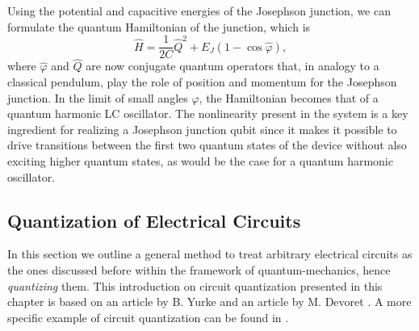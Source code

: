 \smallskip

Using the potential and capacitive energies of the Josephson junction, we can formulate the quantum Hamiltonian of the junction, which is
%
\begin{equation}
\hat{H} = \frac{1}{2C}\hat{Q}^2+E_J(1-\cos{\hat{\varphi}}),
\end{equation}
%
where $\hat{\varphi}$ and $\hat{Q}$ are now conjugate quantum operators that, in analogy to a classical pendulum, play the role of position and momentum for the Josephson junction. In the limit of small angles $\varphi$, the Hamiltonian becomes that of a quantum harmonic LC oscillator. The nonlinearity present in the system is a key ingredient for realizing a Josephson junction qubit since it makes it possible to drive transitions between the first two quantum states of the device without also exciting higher quantum states, as would be the case for a quantum harmonic oscillator.

\subsection{Quantization of Electrical Circuits}

In this section we outline a general method to treat arbitrary electrical circuits as the ones discussed before within the framework of quantum-mechanics, hence {\it quantizing} them. This introduction on circuit quantization presented in this chapter is based on an article by B. Yurke \citep{yurke_quantum_1984} and an article by M. Devoret \cite{devoret_quantum_1995}. A more specific example of circuit quantization can be found in \citep{burkard_multilevel_2004}.

\smallskip


